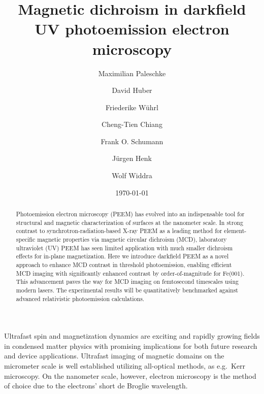 \documentclass[prl,twocolumn,floatfix,superscriptaddress,aps]{revtex4-2}
\begin{document}
\title{Magnetic dichroism in darkfield UV photoemission electron microscopy}
\author{Maximilian Paleschke}
\author{David Huber}
\author{Friederike Wührl}

\author{Cheng-Tien Chiang}

\author{Frank O. Schumann}

\author{Jürgen Henk}
\author{Wolf Widdra}


\date{\today}

\begin{abstract}
    Photoemission electron microscopy (PEEM) has evolved into an indispensable tool for structural and magnetic characterization of surfaces at the nanometer scale. In strong contrast to synchrotron-radiation-based X-ray PEEM as a leading method for element-specific magnetic properties via magnetic circular dichroism (MCD), laboratory ultraviolet (UV) PEEM has seen limited application with much smaller dichroism effects for in-plane magnetization. Here we introduce darkfield PEEM as a novel approach to enhance MCD contrast in threshold photoemission, enabling efficient MCD imaging with significantly enhanced contrast by order-of-magnitude for Fe(001). This advancement paves the way for
    MCD imaging on femtosecond timescales using modern lasers. The experimental results will be quantitatively benchmarked against advanced relativistic photoemission calculations.
\end{abstract}

\pacs{}

\maketitle
Ultrafast spin and magnetization dynamics are exciting and rapidly growing fields in condensed matter physics with promising implications for both future research and device applications. Ultrafast imaging of magnetic domains on the micrometer scale is well established utilizing all-optical methods, as e.g.\ Kerr microscopy. On the nanometer scale, however, electron microscopy is the method of choice due to the electrons' short de Broglie wavelength. 
\end{document}
